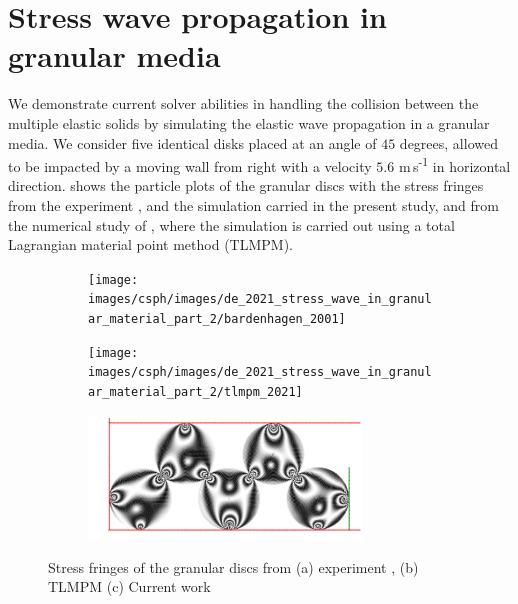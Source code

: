 \section{Stress wave propagation in granular media}
\label{sec:results-stress-wave-propagation-with-friction}
We demonstrate current solver abilities in handling the collision between the
multiple elastic solids by simulating the elastic wave propagation in a granular
media. We consider five identical disks placed at an angle of $45$ degrees,
allowed to be impacted by a moving wall from right with a velocity $5.6$
m\,s\textsuperscript{-1} in horizontal direction.
 shows the particle plots of the granular discs
with the stress fringes from the experiment \citep{guilkey2001improved}, and the
simulation carried in the present study, and from the numerical study of
\cite{de2021modelling}, where the simulation is carried out using a total
Lagrangian material point method (TLMPM).
\begin{figure}[!htpb]
  \centering
  \begin{subfigure}{1.0\textwidth}
    \centering
    \texttt{[image: images/csph/images/de\_2021\_stress\_wave\_in\_granular\_material\_part\_2/bardenhagen\_2001]}
    \subcaption{}\label{fig:de-stress-wave-bardenhagen}
  \end{subfigure}

  \begin{subfigure}{1.0\textwidth}
    \centering
    \texttt{[image: images/csph/images/de\_2021\_stress\_wave\_in\_granular\_material\_part\_2/tlmpm\_2021]}
    \subcaption{}\label{}
  \end{subfigure}

  \begin{subfigure}{1.0\textwidth}
    \centering
    \includegraphics[width=0.8\textwidth]{figures/csph/figures/de_2021_stress_wave_in_granular_material_part_2/case_mohseni/time0}
    \subcaption{}\label{fig:de-stress-wave-current}
  \end{subfigure}
  \caption{Stress fringes of the granular discs from (a) experiment
    \citep{guilkey2001improved}, (b) TLMPM \citep{de2021modelling} (c) Current work}
\label{fig:de-stress-wave-compare}
\end{figure}
